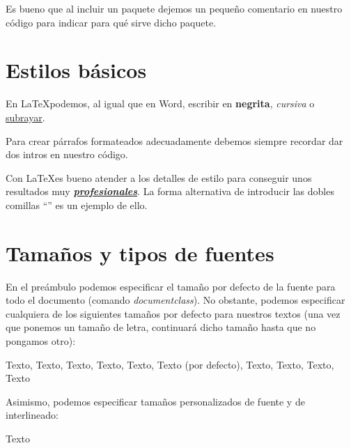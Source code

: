 \documentclass[12pt]{book} %
\begin{document}

Es bueno que al incluir un paquete dejemos un pequeño comentario en nuestro código para indicar para qué sirve dicho paquete.

\section{Estilos básicos}

En \LaTeX podemos,  al igual que en Word, escribir en \textbf{negrita}, \emph{cursiva} o \underline{subrayar}.

Para crear párrafos formateados adecuadamente debemos siempre recordar dar dos intros en nuestro código.

Con \LaTeX es bueno atender a los detalles de estilo para conseguir unos resultados muy \textbf{\underline{\emph{profesionales}}}. La forma alternativa de introducir las dobles comillas ``'' es un ejemplo de ello.

\section{Tamaños y tipos de fuentes}

En el preámbulo podemos especificar el tamaño por defecto de la fuente para todo el documento (comando \emph{documentclass}). No obstante, podemos especificar cualquiera de los siguientes tamaños por defecto para nuestros textos (una vez que ponemos un tamaño de letra, continuará dicho tamaño hasta que no pongamos otro):

\Huge Texto, \huge  Texto, \LARGE Texto, \Large Texto, \large Texto, \normalsize Texto (por defecto), \small Texto, \footnotesize Texto, \scriptsize Texto, \tiny Texto

\normalsize %

Asimismo, podemos especificar tamaños personalizados de fuente y de interlineado:

\fontsize{22pt}{1cm}\selectfont Texto

\normalsize %
\end{document}
